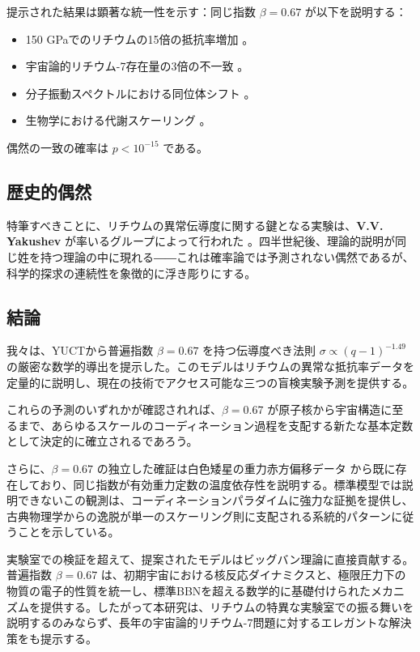 \documentclass[11pt,a4paper]{article}
\theoremstyle{remark}
\begin{document}
	提示された結果は顕著な統一性を示す：同じ指数 \(\beta = 0.67\) が以下を説明する：
	\begin{itemize}
		\item 150 GPaでのリチウムの15倍の抵抗率増加 \cite{fortov2001, yakushev2002}。
		\item 宇宙論的リチウム-7存在量の3倍の不一致 \cite{bertulani2015}。
		\item 分子振動スペクトルにおける同位体シフト \cite{appendixC}。
		\item 生物学における代謝スケーリング \cite{west1997}。
	\end{itemize}
	
	偶然の一致の確率は \(p < 10^{-15}\) である。
	
	\subsection{歴史的偶然}
	
	特筆すべきことに、リチウムの異常伝導度に関する鍵となる実験は、\textbf{V.V. Yakushev} が率いるグループによって行われた \cite{fortov2001, yakushev2002, fortov1999}。四半世紀後、理論的説明が同じ姓を持つ理論の中に現れる――これは確率論では予測されない偶然であるが、科学的探求の連続性を象徴的に浮き彫りにする。
	
	\subsection{結論}
	
	我々は、YUCTから普遍指数 \(\beta = 0.67\) を持つ伝導度べき法則 \(\sigma \propto (q-1)^{-1.49}\) の厳密な数学的導出を提示した。このモデルはリチウムの異常な抵抗率データを定量的に説明し、現在の技術でアクセス可能な三つの盲検実験予測を提供する。
	
	これらの予測のいずれかが確認されれば、\(\beta = 0.67\) が原子核から宇宙構造に至るまで、あらゆるスケールのコーディネーション過程を支配する新たな基本定数として決定的に確立されるであろう。
	
	さらに、\(\beta = 0.67\) の独立した確証は白色矮星の重力赤方偏移データ \cite{Crumpler2024} から既に存在しており、同じ指数が有効重力定数の温度依存性を説明する。標準模型では説明できないこの観測は、コーディネーションパラダイムに強力な証拠を提供し、古典物理学からの逸脱が単一のスケーリング則に支配される系統的パターンに従うことを示している。
	
	実験室での検証を超えて、提案されたモデルはビッグバン理論に直接貢献する。普遍指数 \(\beta = 0.67\) は、初期宇宙における核反応ダイナミクスと、極限圧力下の物質の電子的性質を統一し、標準BBNを超える数学的に基礎付けられたメカニズムを提供する。したがって本研究は、リチウムの特異な実験室での振る舞いを説明するのみならず、長年の宇宙論的リチウム-7問題に対するエレガントな解決策をも提示する。
	
\end{document}
